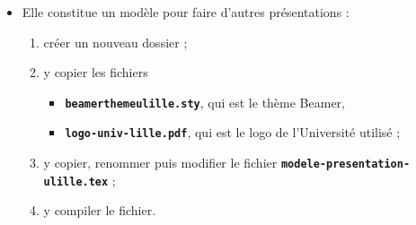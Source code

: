   \begin{itemize}
  \item Elle constitue un modèle pour faire d'autres présentations :
    
    \begin{enumerate}
    \item créer un nouveau dossier ;
    \item y copier les fichiers 

      \begin{itemize}
      \item \texttt{\textbf{beamerthemeulille.sty}}, qui est le thème Beamer,
      \item \texttt{\textbf{logo-univ-lille.pdf}}, qui est le logo de l'Université utilisé ;
      \end{itemize}

    \item y copier, renommer puis modifier le fichier \texttt{\textbf{modele-presentation-ulille.tex}} ;
    \item y compiler le fichier.
    \end{enumerate}
  \end{itemize}
